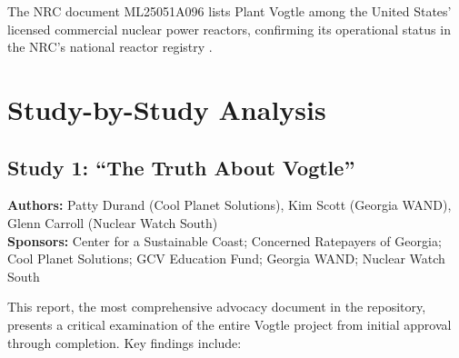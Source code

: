 \documentclass[12pt,a4paper]{article}
\begin{document}
The NRC document ML25051A096 lists Plant Vogtle among the United States' licensed
commercial nuclear power reactors, confirming its operational status in the NRC's
national reactor registry \cite{nrc_ml25051}.

\section{Study-by-Study Analysis}

\subsection{Study 1: ``The Truth About Vogtle''}

\textbf{Authors:} Patty Durand (Cool Planet Solutions), Kim Scott (Georgia WAND),
Glenn Carroll (Nuclear Watch South)\\
\textbf{Sponsors:} Center for a Sustainable Coast; Concerned Ratepayers of Georgia;
Cool Planet Solutions; GCV Education Fund; Georgia WAND; Nuclear Watch South

This report, the most comprehensive advocacy document in the repository, presents
a critical examination of the entire Vogtle project from initial approval through
completion. Key findings include:
\end{document}
